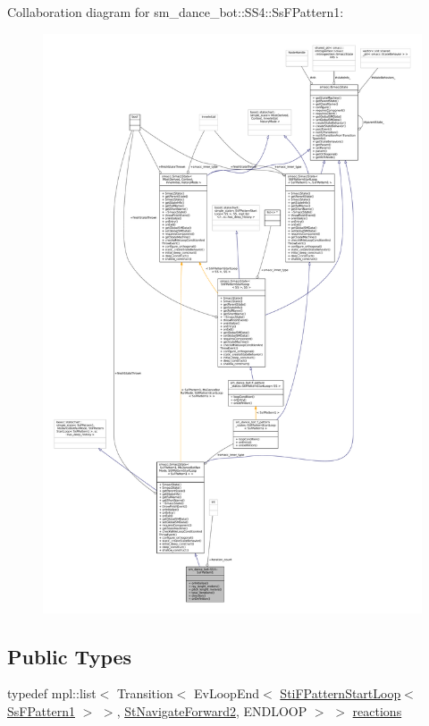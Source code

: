 Collaboration diagram for sm\+\_\+dance\+\_\+bot\+:\+:S\+S4\+:\+:Ss\+F\+Pattern1\+:
\nopagebreak
\begin{figure}[H]
\begin{center}
\leavevmode
\includegraphics[width=350pt]{structsm__dance__bot_1_1SS4_1_1SsFPattern1__coll__graph}
\end{center}
\end{figure}
\subsection*{Public Types}
\begin{DoxyCompactItemize}
\item 
typedef mpl\+::list$<$ Transition$<$ Ev\+Loop\+End$<$ \hyperlink{structsm__dance__bot_1_1f__pattern__states_1_1StiFPatternStartLoop}{Sti\+F\+Pattern\+Start\+Loop}$<$ \hyperlink{structsm__dance__bot_1_1SS4_1_1SsFPattern1}{Ss\+F\+Pattern1} $>$ $>$, \hyperlink{structsm__dance__bot_1_1StNavigateForward2}{St\+Navigate\+Forward2}, E\+N\+D\+L\+O\+OP $>$ $>$ \hyperlink{structsm__dance__bot_1_1SS4_1_1SsFPattern1_a29f0e587dbea2e8668b0851d85f50c54}{reactions}
\end{DoxyCompactItemize}

